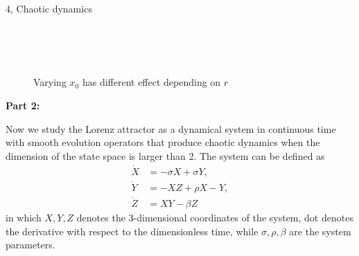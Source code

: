 \documentclass[10pt,a4paper]{article}
\begin{document}
\begin{task}{4, Chaotic dynamics}
\begin{figure} [H]
    \centering
    \\
    \\
    \\
    \caption{Varying $x_0$ has different effect depending on $r$}
    \label{fig:task4-1-x0}
\end{figure}

\newpage

\noindent \textbf{Part 2:} 

Now we study the Lorenz attractor as a dynamical system in continuous time with smooth evolution operators that produce chaotic dynamics when the dimension of the state space is larger than 2. The system can be defined as
\begin{align}
    \dot{X} &= -\sigma X + \sigma Y,\\
    \dot{Y} &= -XZ+\rho X-Y,\\
    \dot{Z} &= XY-\beta Z
\end{align}
in which $X, Y, Z$ denotes the 3-dimensional coordinates of the system, dot denotes the derivative with respect to the dimensionless time, while $\sigma, \rho, \beta$ are the system parameters.


\end{task}
\end{document}
